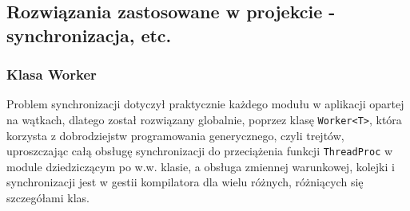\documentclass{article}
\begin{document}
	\subsection{Rozwiązania zastosowane w projekcie - synchronizacja, etc.}
		\subsubsection{Klasa Worker}
		 Problem synchronizacji dotyczył praktycznie każdego modułu w aplikacji opartej na wątkach, dlatego został rozwiązany globalnie, poprzez klasę \texttt{Worker<T>}, która korzysta z dobrodziejstw programowania generycznego, czyli trejtów, uproszczając całą obsługę synchronizacji do przeciążenia funkcji \texttt{ThreadProc} w module dziedziczącym po w.w. klasie, a obsługa zmiennej warunkowej, kolejki i synchronizacji jest w gestii kompilatora dla wielu różnych, różniących się szczegółami klas.
		 
	\newpage 
\end{document}
